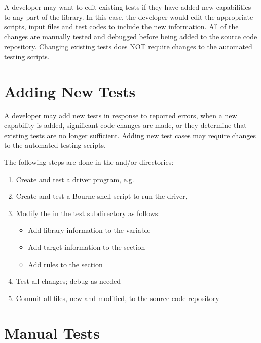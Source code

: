 A developer may want to edit existing tests if they have added new capabilities to any
part of the library.  In this case, the developer would edit the appropriate scripts,
input files and test codes to include the new information.  All of the changes are 
manually tested and debugged before being added to the source code repository. Changing
existing tests does NOT require changes to the automated testing scripts.

\section{Adding New Tests}
\label{Adding New Tests}

A developer may add new tests in response to reported errors, when a new capability
is added, significant code changes are made, or they determine that existing tests 
are no longer sufficient.  Adding new test cases may require changes to the 
automated testing scripts.

The following steps are done in the  and/or  directories:
\begin{enumerate}
\item Create and test a driver program, e.g. 
\item Create and test a Bourne shell script to run the driver, 
\item Modify the  in the test subdirectory as follows:
  \begin{itemize}
  \item Add library information to the  variable
  \item Add target information to the  section
  \item Add rules to the  section
  \end{itemize}
\item Test all changes; debug as needed
\item Commit all files, new and modified, to the source code repository
\end{enumerate}

\section{Manual Tests}
\label{Manual Tests}

